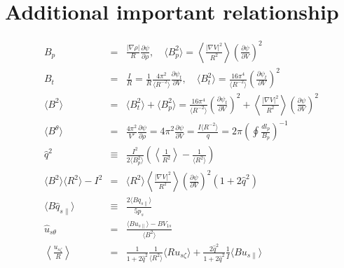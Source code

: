 \documentclass[11pt]{article}
\def\ave#1{\left\langle#1\right\rangle}
\def\aves#1{\langle#1\rangle}
\def\dd#1#2{\frac{\partial #1}{\partial #2}}
\def\para{\parallel}
\def\psit{\psi_t}
\def\uszt{u_{s\zeta}}
\def\bri{\aves{B^2}\aves{R^2} - I^2}
\def\uspara{u_{s\para}}
\begin{document}
\bigskip

\section{Additional important relationship}
\setcounter{equation}{0}

\begin{eqnarray}
  B_p &=&
%
  \frac{|\nabla\rho|}{R} \dd{\psi}{\rho},
  \quad
  \aves{B_p^2} =
%
  \ave{\frac{|\nabla V|^2}{R^2}} \left(\dd{\psi}{V}\right)^2
\\[5mm]
  B_t &=&
%
  \frac{I}{R}
%
  = \frac{1}{R} \frac{4\pi^2}{\aves{R^{-2}}} \dd{\psit}{V},
  \quad
  \aves{B_t^2} =
%
  \frac{16\pi^4}{\aves{R^{-2}}} \left(\dd{\psit}{V}\right)^2
\\[5mm]
  \aves{B^2} &=&
%
  \aves{B_t^2} + \aves{B_p^2}
%
  = \frac{16\pi^4}{\aves{R^{-2}}}\left(\dd{\psit}{V}\right)^2
  + \ave{\frac{|\nabla V|^2}{R^2}}\left(\dd{\psi}{V}\right)^2
\\[5mm]
  \aves{B^\theta} &=&
%
  \frac{4\pi^2}{V'} \dd{\psi}{\rho}
%
  = 4\pi^2 \dd{\psi}{V}
%
  = \frac{I\aves{R^{-2}}}{q}
%
  = 2\pi\left(\oint \frac{dl_p}{B_p}\right)^{-1}
\\[5mm]
  \hat{q}^2 &\equiv& \frac{I^2}{2\aves{B_p^2}}\left(\ave{\frac{1}{R^2}}-\frac{1}{\aves{R^2}}\right)
\\[5mm]
  \bri &=&
%
  \aves{R^2} \ave{\frac{|\nabla V|^2}{R^2}} \left(\dd{\psi}{V}\right)^2 (1+2\hat{q}^2)
\\[5mm]
 \aves{B\hat{q}_{s\para}} &\equiv&
%
 \frac{2\aves{Bq_{s\para}}}{5p_s}
\\[5mm]
  \hat{u}_{s\theta} &=&
%
  \frac{\aves{B\uspara} - BV_{1s}}{ \aves{B^2} }
\\[5mm]
  \ave{\frac{\uszt}{R}} &=&
%
  \frac{1}{1+2\hat{q}^2}\frac{1}{\aves{R^2}}\aves{R\uszt}+\frac{2\hat{q}^2}{1+2\hat{q}^2}\frac{1}{I}\aves{B\uspara}
\\[2.5mm]
%
%

\end{eqnarray}
\end{document}
